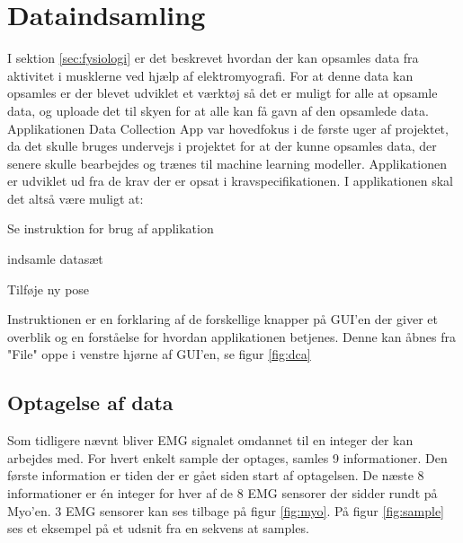 \thispagestyle{fancy}
\chapter{Dataindsamling}
\label{chp:dataingsamlingChapter}
I sektion \ref{sec:fysiologi} er det beskrevet hvordan der kan opsamles data fra aktivitet i musklerne ved hjælp af elektromyografi. For at denne data kan opsamles er der blevet udviklet et værktøj så det er muligt for alle at opsamle data, og uploade det til skyen for at alle kan få gavn af den opsamlede data. Applikationen Data Collection App var hovedfokus i de første uger af projektet, da det skulle bruges undervejs i projektet for at der kunne opsamles data, der senere skulle bearbejdes og trænes til machine learning modeller. Applikationen er udviklet ud fra de krav der er opsat i kravspecifikationen\citep{RefWorks:8}. I applikationen skal det altså være muligt at:
\begin{myItemize}
	\item Se instruktion for brug af applikation
	\item indsamle datasæt
	\item Tilføje ny pose
\end{myItemize}
Instruktionen er en forklaring af de forskellige knapper på GUI'en der giver et overblik og en forståelse for hvordan applikationen betjenes. Denne kan åbnes fra "File" oppe i venstre hjørne af GUI'en, se figur \ref{fig:dca} 

\section{Optagelse af data}
\label{sec:optagelsedata}
Som tidligere nævnt bliver EMG signalet omdannet til en integer der kan arbejdes med. For hvert enkelt sample der optages, samles 9 informationer. Den første information er tiden der er gået siden start af optagelsen. De næste 8 informationer er én integer for hver af de 8 EMG sensorer der sidder rundt på Myo'en. 3 EMG sensorer kan ses tilbage på figur \ref{fig:myo}.
På figur \ref{fig:sample} ses et eksempel på et udsnit fra en sekvens at samples.


